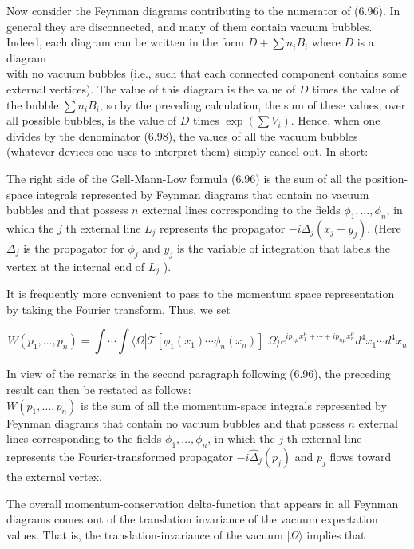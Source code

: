 \documentclass[10pt, letterpaper]{article}
\begin{document}
Now consider the Feynman diagrams contributing to the numerator of (6.96). In general they are disconnected, and many of them contain vacuum bubbles. Indeed, each diagram can be written in the form $D+\sum n_{i} B_{i}$ where $D$ is a diagram\\
with no vacuum bubbles (i.e., such that each connected component contains some external vertices). The value of this diagram is the value of $D$ times the value of the bubble $\sum n_{i} B_{i}$, so by the preceding calculation, the sum of these values, over all possible bubbles, is the value of $D$ times $\exp \left(\sum V_{i}\right)$. Hence, when one divides by the denominator (6.98), the values of all the vacuum bubbles (whatever devices one uses to interpret them) simply cancel out. In short:

The right side of the Gell-Mann-Low formula (6.96) is the sum of all the position-space integrals represented by Feynman diagrams that contain no vacuum bubbles and that possess $n$ external lines corresponding to the fields $\phi_{1}, \ldots, \phi_{n}$, in which the $j$ th external line $L_{j}$ represents the propagator $-i \Delta_{j}\left(x_{j}-y_{j}\right)$. (Here $\Delta_{j}$ is the propagator for $\phi_{j}$ and $y_{j}$ is the variable of integration that labels the vertex at the internal end of $L_{j}$ ).

It is frequently more convenient to pass to the momentum space representation by taking the Fourier transform. Thus, we set

$$
W\left(p_{1}, \ldots, p_{n}\right)=\int \cdots \int\langle\Omega| \mathcal{T}\left[\phi_{1}\left(x_{1}\right) \cdots \phi_{n}\left(x_{n}\right)\right]|\Omega\rangle e^{i p_{1 \mu} x_{1}^{\mu}+\cdots+i p_{n \mu} x_{n}^{\mu}} d^{4} x_{1} \cdots d^{4} x_{n}
$$

In view of the remarks in the second paragraph following (6.96), the preceding result can then be restated as follows:\\
$W\left(p_{1}, \ldots, p_{n}\right)$ is the sum of all the momentum-space integrals represented by Feynman diagrams that contain no vacuum bubbles and that possess $n$ external lines corresponding to the fields $\phi_{1}, \ldots, \phi_{n}$, in which the $j$ th external line represents the Fourier-transformed propagator $-i \widehat{\Delta}_{j}\left(p_{j}\right)$ and $p_{j}$ flows toward the external vertex.

The overall momentum-conservation delta-function that appears in all Feynman diagrams comes out of the translation invariance of the vacuum expectation values. That is, the translation-invariance of the vacuum $|\Omega\rangle$ implies that
\end{document}
